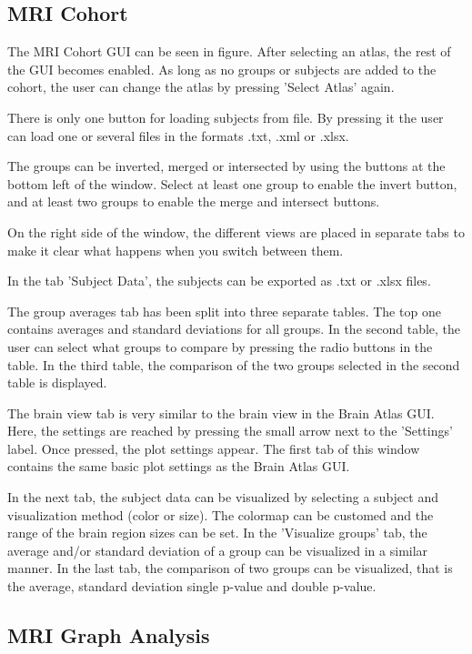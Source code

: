 \documentclass{article}
\begin{document}
\subsection{MRI Cohort}

The MRI Cohort GUI can be seen in figure. After selecting an atlas, the rest of the GUI becomes enabled. As long as no groups or subjects are added to the cohort, the user can change the atlas by pressing 'Select Atlas' again.

There is only one button for loading subjects from file. By pressing it the user can load one or several files in the formats .txt, .xml or .xlsx.

The groups can be inverted, merged or intersected by using the buttons at the bottom left of the window. Select at least one group to enable the invert button, and at least two groups to enable the merge and intersect buttons. 

On the right side of the window, the different views are placed in separate tabs to make it clear what happens when you switch between them.

In the tab 'Subject Data', the subjects can be exported as .txt or .xlsx files.

The group averages tab has been split into three separate tables. The top one contains averages and standard deviations for all groups. In the second table, the user can select what groups to compare by pressing the radio buttons in the table. In the third table, the comparison of the two groups selected in the second table is displayed.

The brain view tab is very similar to the brain view in the Brain Atlas GUI. Here, the settings are reached by pressing the small arrow next to the 'Settings' label. Once pressed, the plot settings appear. The first tab of this window contains the same basic plot settings as the Brain Atlas GUI.

In the next tab, the subject data can be visualized by selecting a subject and visualization method (color or size). The colormap can be customed and the range of the brain region sizes can be set. In the 'Visualize groups' tab, the average and/or standard deviation of a group can be visualized in a similar manner. In the last tab, the comparison of two groups can be visualized, that is the average, standard deviation single p-value and double p-value. 

\subsection{MRI Graph Analysis}
\label{sec:mri_ga}
\end{document}
